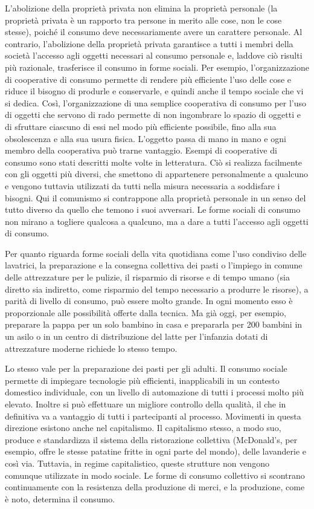 \documentclass[12pt,a4paper,openany]{book}
\begin{document}
L'abolizione della proprietà privata non elimina la proprietà personale (la proprietà privata è un rapporto tra persone in merito alle cose, non le cose stesse), poiché il consumo deve necessariamente avere un carattere personale. Al contrario, l'abolizione della proprietà privata garantisce a tutti i membri della società l'accesso agli oggetti necessari al consumo personale e, laddove ciò risulti più razionale, trasferisce il consumo in forme sociali. Per esempio, l'organizzazione di cooperative di consumo permette di rendere più efficiente l'uso delle cose e riduce il bisogno di produrle e conservarle, e quindi anche il tempo sociale che vi si dedica. Così, l'organizzazione di una semplice cooperativa di consumo per l'uso di oggetti che servono di rado permette di non ingombrare lo spazio di oggetti e di sfruttare ciascuno di essi nel modo più efficiente possibile, fino alla sua obsolescenza e alla sua usura fisica. L'oggetto passa di mano in mano e ogni membro della cooperativa può trarne vantaggio. Esempi di cooperative di consumo sono stati descritti molte volte in letteratura. Ciò si realizza facilmente con gli oggetti più diversi, che smettono di appartenere personalmente a qualcuno e vengono tuttavia utilizzati da tutti nella misura necessaria a soddisfare i bisogni. Qui il comunismo si contrappone alla proprietà personale in un senso del tutto diverso da quello che temono i suoi avversari. Le forme sociali di consumo non mirano a togliere qualcosa a qualcuno, ma a dare a tutti l'accesso agli oggetti di consumo.

Per quanto riguarda forme sociali della vita quotidiana come l'uso condiviso delle lavatrici, la preparazione e la consegna collettiva dei pasti o l'impiego in comune delle attrezzature per le pulizie, il risparmio di risorse e di tempo umano (sia diretto sia indiretto, come risparmio del tempo necessario a produrre le risorse), a parità di livello di consumo, può essere molto grande. In ogni momento esso è proporzionale alle possibilità offerte dalla tecnica. Ma già oggi, per esempio, preparare la pappa per un solo bambino in casa e prepararla per 200 bambini in un asilo o in un centro di distribuzione del latte per l'infanzia dotati di attrezzature moderne richiede lo stesso tempo.

Lo stesso vale per la preparazione dei pasti per gli adulti. Il consumo sociale permette di impiegare tecnologie più efficienti, inapplicabili in un contesto domestico individuale, con un livello di automazione di tutti i processi molto più elevato. Inoltre si può effettuare un migliore controllo della qualità, il che in definitiva va a vantaggio di tutti i partecipanti al processo. Movimenti in questa direzione esistono anche nel capitalismo. Il capitalismo stesso, a modo suo, produce e standardizza il sistema della ristorazione collettiva (McDonald's, per esempio, offre le stesse patatine fritte in ogni parte del mondo), delle lavanderie e così via. Tuttavia, in regime capitalistico, queste strutture non vengono comunque utilizzate in modo sociale. Le forme di consumo collettivo si scontrano continuamente con la resistenza della produzione di merci, e la produzione, come è noto, determina il consumo.
\end{document}
